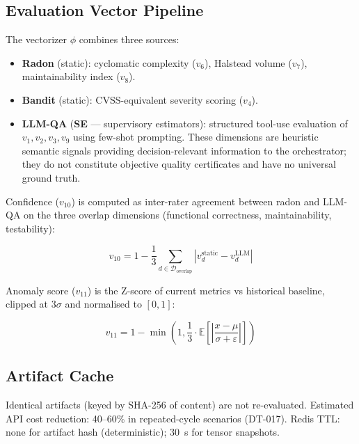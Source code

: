 \documentclass[manuscript,review,anonymous]{acmart}
\begin{document}
\subsection{Evaluation Vector Pipeline}

The vectorizer $\phi$ combines three sources:
\begin{itemize}
  \item \textbf{Radon} (static): cyclomatic complexity ($v_6$), Halstead volume
    ($v_7$), maintainability index ($v_8$).
  \item \textbf{Bandit} (static): CVSS-equivalent severity scoring ($v_4$).
  \item \textbf{LLM-QA} (\textbf{SE} --- supervisory estimators): structured tool-use
    evaluation of $v_1, v_2, v_3, v_9$ using few-shot prompting. These dimensions are
    heuristic semantic signals providing decision-relevant information to the orchestrator;
    they do not constitute objective quality certificates and have no universal ground truth.
\end{itemize}

Confidence ($v_{10}$) is computed as inter-rater agreement between radon and LLM-QA
on the three overlap dimensions (functional correctness, maintainability, testability):

\begin{equation}
  v_{10} = 1 - \frac{1}{3} \sum_{d \in \mathcal{D}_\text{overlap}}
  \left| v_d^{\text{static}} - v_d^{\text{LLM}} \right|
\end{equation}

Anomaly score ($v_{11}$) is the Z-score of current metrics vs historical baseline,
clipped at $3\sigma$ and normalised to $[0,1]$:

\begin{equation}
  v_{11} = 1 - \min\!\left(1, \frac{1}{3} \cdot
  \mathbb{E}\!\left[\left|\frac{x - \mu}{\sigma + \varepsilon}\right|\right]\right)
\end{equation}

\subsection{Artifact Cache}

Identical artifacts (keyed by SHA-256 of content) are not re-evaluated.
Estimated API cost reduction: 40--60\% in repeated-cycle scenarios (DT-017).
Redis TTL: none for artifact hash (deterministic); 30~s for tensor snapshots.

\end{document}

